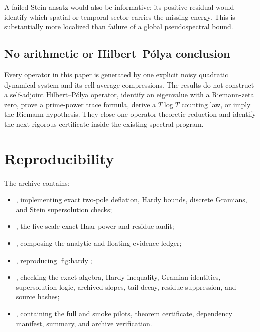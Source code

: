 \documentclass[11pt]{article}
\theoremstyle{definition}
\theoremstyle{remark}
\begin{document}
A failed Stein ansatz would also be informative: its positive residual
would identify which spatial or temporal sector carries the missing energy.
This is substantially more localized than failure of a global
pseudospectral bound.

\subsection{No arithmetic or Hilbert--P\'olya conclusion}

Every operator in this paper is generated by one explicit noisy quadratic
dynamical system and its cell-average compressions.  The results do not
construct a self-adjoint Hilbert--P\'olya operator, identify an eigenvalue
with a Riemann-zeta zero, prove a prime-power trace formula, derive a
\(T\log T\) counting law, or imply the Riemann hypothesis.  They close one
operator-theoretic reduction and identify the next rigorous certificate
inside the existing spectral program.

\section{Reproducibility}
\label{sec:reproducibility}

The archive contains:

\begin{itemize}[leftmargin=2em]
 \item {}, implementing exact two-pole deflation,
 Hardy bounds, discrete Gramians, and Stein supersolution checks;
 \item {}, the five-scale
 exact-Haar power and residue audit;
 \item {}, composing the analytic
 and floating evidence ledger;
 \item {}, reproducing
 \cref{fig:hardy};
 \item {}, checking the exact algebra, Hardy inequality, Gramian
 identities, supersolution logic, archived slopes, tail decay, residue
 suppression, and source hashes;
 \item {}, containing the full and smoke pilots, theorem
 certificate, dependency manifest, summary, and archive verification.
\end{itemize}
\end{document}
